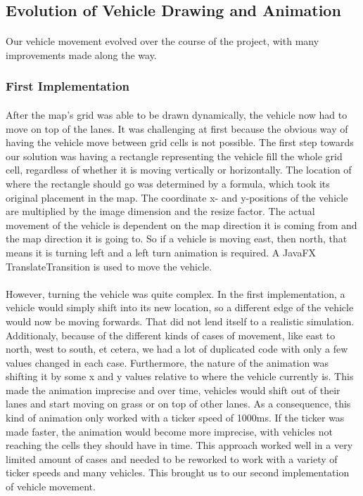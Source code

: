 \documentclass[a4paper,11pt,titlepage]{article}
\begin{document}
\subsection{Evolution of Vehicle Drawing and Animation}
\paragraph{}
Our vehicle movement evolved over the course of the project, with many improvements made along the way. 
\subsubsection{First Implementation}
\paragraph{}
After the map's grid was able to be drawn dynamically, the vehicle now had to move on top of the lanes. It was challenging at first because the obvious way of having the vehicle move between grid cells is not possible. The first step towards our solution was having a rectangle representing the vehicle fill the whole grid cell, regardless of whether it is moving vertically or horizontally. The location of where the rectangle should go was determined by a formula, which took its original placement in the map. The coordinate x- and y-positions of the vehicle are multiplied by the image dimension and the resize factor. The actual movement of the vehicle is dependent on the map direction it is coming from and the map direction it is going to. So if a vehicle is moving east, then north, that means it is turning left and a left turn animation is required. A JavaFX TranslateTransition is used to move the vehicle.
\paragraph{}
However, turning the vehicle was quite complex. In the first implementation, a vehicle would simply shift into its new location, so a different edge of the vehicle would now be moving forwards. That did not lend itself to a realistic simulation. Additionaly, because of the different kinds of cases of movement, like east to north, west to south, et cetera, we had a lot of duplicated code with only a few values changed in each case. Furthermore, the nature of the animation was shifting it by some x and y values relative to where the vehicle currently is. This made the animation imprecise and over time, vehicles would shift out of their lanes and start moving on grass or on top of other lanes. As a consequence, this kind of animation only worked with a ticker speed of 1000ms. If the ticker was made faster, the animation would become more imprecise, with vehicles not reaching the cells they should have in time. This approach worked well in a very limited amount of cases and needed to be reworked to work with a variety of ticker speeds and many vehicles. This brought us to our second implementation of vehicle movement.
\end{document}
